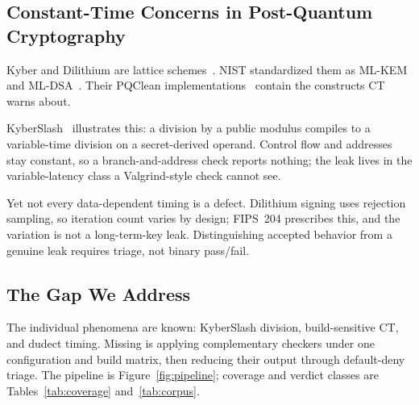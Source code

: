 \subsection{Constant-Time Concerns in Post-Quantum Cryptography}

Kyber and Dilithium are lattice schemes~\cite{kyber,dilithium}. NIST standardized
them as ML-KEM and ML-DSA~\cite{fips203,fips204}. Their PQClean
implementations~\cite{pqclean} contain the constructs CT warns about.

KyberSlash~\cite{kyberslash} illustrates this: a division by a public modulus
compiles to a variable-time division on a secret-derived operand. Control flow
and addresses stay constant, so a branch-and-address check reports nothing; the
leak lives in the variable-latency class a Valgrind-style check cannot see.

Yet not every data-dependent timing is a defect. Dilithium signing uses rejection
sampling, so iteration count varies by design; FIPS~204 prescribes this, and the
variation is not a long-term-key leak. Distinguishing accepted behavior from a
genuine leak requires triage, not binary pass/fail.

\subsection{The Gap We Address}

The individual phenomena are known: KyberSlash division, build-sensitive CT, and
dudect timing. Missing is applying complementary checkers under one configuration
and build matrix, then reducing their output through default-deny triage. The
pipeline is Figure~\ref{fig:pipeline}; coverage and verdict classes are
Tables~\ref{tab:coverage} and~\ref{tab:corpus}.
